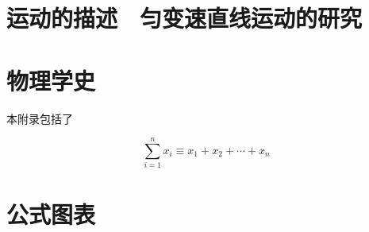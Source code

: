 \documentclass[cn,11pt]{elegantbook}
\begin{document}
\chapter{运动的描述　匀变速直线运动的研究}

\nocite{*} 



\appendix
\chapter{物理学史}

本附录包括了

\begin{equation}
\sum_{i=1}^n x_i \equiv x_1 + x_2 +\cdots + x_n
\end{equation}



\chapter{公式图表}
\end{document}
